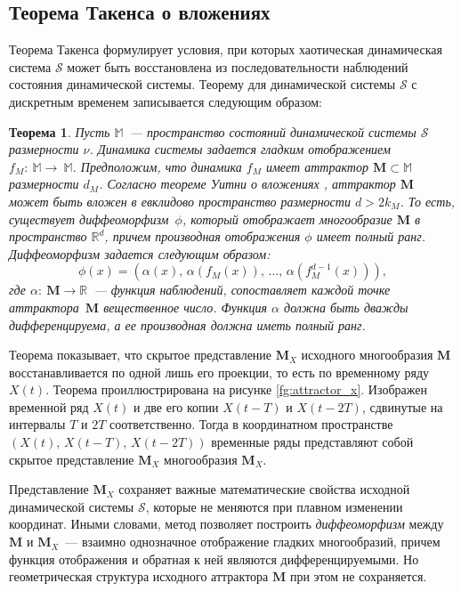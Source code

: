\documentclass[12pt]{extarticle}
\newcommand{\bM}{\mathbf{M}}
\newtheorem{theorem}{Теорема}
\begin{document}
\subsection{Теорема Такенса о вложениях}
Теорема Такенса формулирует условия, при которых хаотическая динамическая система $\mathcal{S}$ может быть восстановлена из последовательности наблюдений состояния динамической системы.
Теорему для динамической системы $\mathcal{S}$ с дискретным временем записывается следующим образом:
\begin{theorem}
Пусть $\mathbb{M}$~--- пространство состояний динамической системы $\mathcal{S}$ размерности $\nu$. Динамика системы задается гладким отображением $f_{M}:\: \mathbb{M} \rightarrow~\mathbb{M}$. Предположим, что динамика $f_{M}$ имеет аттрактор $\bM \subset \mathbb{M}$ размерности $d_{M}$. Согласно теореме Уитни о вложениях \cite{whitney1944singularities}, аттрактор $\bM$ может быть вложен в евклидово пространство размерности $d > 2k_M$. То есть, существует диффеоморфизм~$\phi$, который отображает многообразие $\bM$ в пространство $\mathbb{R}^d$, причем производная отображения $\phi$ имеет полный ранг.\\
Диффеоморфизм задается следующим образом:
\begin{equation}
    \phi(x) = (\alpha(x),\, \alpha(f_M(x)),\, \dots,\, \alpha(f_M^{d-1}(x))),
\end{equation}
где $\alpha:\: \bM\rightarrow \mathbb{R}$~--- функция наблюдений, сопоставляет каждой точке аттрактора~$\bM$ вещественное число. Функция $\alpha$ должна быть дважды дифференцируема, а ее производная должна иметь полный ранг.
\label{Taken's theorem}
\end{theorem}
Теорема показывает, что скрытое представление $\mathbf{M}_X$ исходного многообразия $\mathbf{M}$ восстанавливается по одной лишь его проекции, то есть по временному ряду $X(t)$. Теорема проиллюстрирована на рисунке \ref{fg:attractor_x}. Изображен временной ряд $X(t)$ и две его копии $X(t-T)$ и $X(t-2T)$, сдвинутые на интервалы $T$ и $2T$ соответственно. Тогда в координатном пространстве $(X(t),\,X(t-T),\,X(t-2T))$ временные ряды представляют собой скрытое представление $\mathbf{M}_X$ многообразия $\mathbf{M}_X$.

Представление $\mathbf{M}_X$ сохраняет важные математические свойства исходной динамической системы $\mathcal{S}$, которые не меняются при плавном изменении координат. Иными словами, метод позволяет построить \emph{диффеоморфизм} между $\mathbf{M}$ и $\mathbf{M}_X$~--- взаимно однозначное отображение гладких многообразий, причем функция отображения и обратная к ней являются дифференцируемыми. Но геометрическая структура исходного аттрактора $\bM$ при этом не сохраняется.
\end{document}
